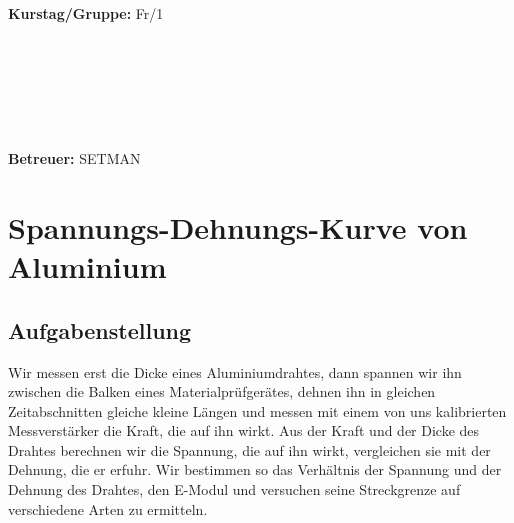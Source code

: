 \documentclass{article}
\begin{document}
\begin{verbatim}


\end{verbatim}
			\begin{flushleft}
			\textbf{\Large{Kurstag/Gruppe:}} \Large{Fr/1}
			\end{flushleft}

\begin{verbatim}






\end{verbatim}
			\begin{flushleft}
			\LARGE{\textbf{Betreuer:}}	\Large{SETMAN}	
			\end{flushleft}
			
\newpage
\section{Spannungs-Dehnungs-Kurve von Aluminium}
\subsection{Aufgabenstellung}
Wir messen erst die Dicke eines Aluminiumdrahtes, dann spannen wir ihn zwischen die Balken eines Materialprüfgerätes, dehnen ihn in gleichen Zeitabschnitten gleiche kleine Längen und messen mit einem von uns kalibrierten Messverstärker die Kraft, die auf ihn wirkt. Aus der Kraft und der Dicke des Drahtes berechnen wir die Spannung, die auf ihn wirkt, vergleichen sie mit der Dehnung, die er erfuhr. Wir bestimmen so das Verhältnis der Spannung und der Dehnung des Drahtes, den E-Modul und versuchen seine Streckgrenze auf verschiedene Arten zu ermitteln.
\end{document}

